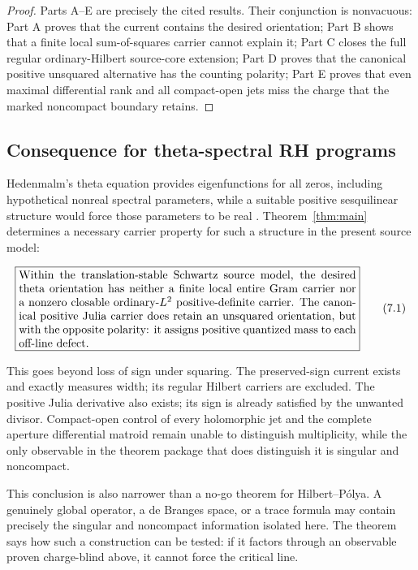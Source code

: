 \documentclass[11pt]{article}
\theoremstyle{definition}
\theoremstyle{remark}
\newcommand{\eqtag}[1]{\qquad\text{\upshape(#1)}}
\begin{document}
\begin{proof}
Parts A--E are precisely the cited results.  Their conjunction is
nonvacuous: Part A proves that the current contains the desired
orientation; Part B shows that a finite local sum-of-squares carrier
cannot explain it; Part C closes the full regular ordinary-Hilbert
source-core extension; Part D proves that the canonical positive
unsquared alternative has the counting polarity; Part E proves that
even maximal differential rank and all compact-open jets miss the
charge that the marked noncompact boundary retains.
\end{proof}

\subsection{Consequence for theta-spectral RH programs}

Hedenmalm's theta equation provides eigenfunctions for all zeros, including
hypothetical nonreal spectral parameters, while a suitable positive
sesquilinear structure would force those parameters to be real
\cite{Hedenmalm2026}.  Theorem~\ref{thm:main} determines a necessary
carrier property for such a structure in the present source model:

\[
\boxed{
\begin{minipage}{0.86\linewidth}
Within the translation-stable Schwartz source model, the desired theta
orientation has neither a finite local entire Gram carrier nor a
nonzero closable ordinary-\(L^2\) positive-definite carrier.  The
canonical positive Julia carrier does retain an unsquared orientation,
but with the opposite polarity: it assigns positive quantized mass to
each off-line defect.
\end{minipage}}                                                     \eqtag{7.1}
\]

This goes beyond loss of sign under squaring.  The preserved-sign
current exists and exactly measures width; its
regular Hilbert carriers are excluded.  The positive Julia derivative
also exists; its sign is already satisfied by the unwanted divisor.
Compact-open control of every holomorphic jet and the complete aperture
differential matroid remain unable to distinguish multiplicity, while
the only observable in the theorem package that does distinguish it is
singular and noncompact.

This conclusion is also narrower than a no-go theorem for
Hilbert--P\'olya.  A genuinely global operator, a de Branges space, or a
trace formula may contain precisely the singular and noncompact
information isolated here.  The theorem says how such a construction can
be tested: if it factors through an observable proven charge-blind above,
it cannot force the critical line.
\end{document}
